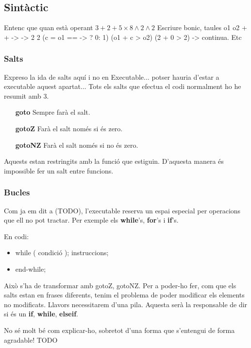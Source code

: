 \subsection{Sintàctic}



Entenc que quan està operant
$ 3 + 2 + 5 \times 8 \wedge 2 \wedge 2 $
Escriure bonic, taules
o1 o2
+  +
-> ->
2  2
(c = o1 == -> ? 0: 1)
(o1 + c > o2)
(2 + 0 > 2) -> continua. Etc

\subsubsection{Salts}
Expreso la ida de salts aquí i no en Executable... potser hauria d'estar a executable aquest
apartat...
Tots els salts que efectua el codi normalment ho he resumit amb 3.
\begin{itemize}
    \item[\textbf{goto}] Sempre farà el salt.
    \item[\textbf{gotoZ}] Farà el salt només si és zero.
    \item[\textbf{gotoNZ}] Farà el salt només si no és zero.
\end{itemize}
Aquests estan restringits amb la funció que estiguin.
D'aquesta manera és impossible fer un salt entre funcions.

\subsubsection{Bucles}
Com ja em dit a (TODO), l'executable reserva un espai especial per operacions que ell no pot tractar.
Per exemple els \textbf{while}'s, \textbf{for}'s i \textbf{if}'s.

En codi:
\begin{itemize}
    \item while ( condició );
        \subitem instruccions;
    \item end-while;
\end{itemize}

Això s'ha de transformar amb gotoZ, gotoNZ.
Per a poder-ho fer, com que els salts estan en frases diferents,
tenim el problema de poder modificar els elements no modificats.
Llavors necessitarem d'una pila.
Aquesta serà la responsable de dir si és un \textbf{if}, \textbf{while}, \textbf{elseif}.

No sé molt bé com explicar-ho, sobretot d'una forma que s'entengui de forma agradable!
TODO